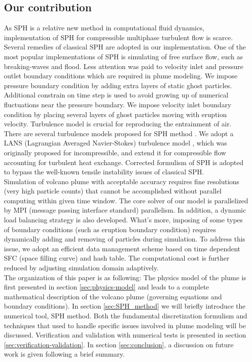 \documentclass[journal abbreviation, manuscript]{copernicus}
\begin{document}
\subsection{Our contribution}
As SPH is a relative new method in computational fluid dynamics, implementation of SPH for compressible multiphase turbulent flow is scarce. Several remedies of classical SPH are adopted in our implementation. One of the most popular implementations of SPH is simulating of free surface flow, such as breaking-waves and flood. Less attention was paid to velocity inlet and pressure outlet boundary conditions which are required in plume modeling. We impose pressure boundary condition by adding extra layers of static ghost particles. Additional constrain on time step is used to avoid growing up of numerical fluctuations near the pressure boundary. We impose velocity inlet boundary condition by placing several layers of ghost particles moving with eruption velocity. Turbulence model is crucial for reproducing the entrainment of air. There are several turbulence models proposed for SPH method \citep{issa2005numerical,violeau2007numerical}. We adopt a LANS (Lagrangian Averaged Navier-Stokes) turbulence model \citep{monaghan2011turbulence}, which was originally proposed for incompressible, and extend it for compressible flow accounting for turbulent heat exchange. Corrected formulism of SPH is adopted to bypass the well-known tensile instability issues of classical SPH.\\
%
Simulation of volcano plume with acceptable accuracy requires fine resolutions (very high particle counts) that cannot be accomplished without parallel computing within given time window. The core solver of our model is parallelized by MPI (message passing interface standard) parallelism. In addition, a dynamic load balancing strategy is also developed. What's more, imposing of some types of boundary conditions (such as eruption boundary condition) requires dynamically adding and removing of particles during simulation. To address this issue, we adopt an efficient data management scheme based on time dependent SFC (space filling curve) and hash table. The computational cost is further reduced by adjusting simulation domain adaptively.\\
The organization of this paper is as following:
The physics model of the plume is first presented in section \ref{sec:physics-model} and leads to a complete mathematical description of the volcano plume (governing equations and boundary conditions). In section \ref{sec:SPH_method} we will briefly introduce the numerical tool, SPH method. Both the fundamental discretization formulism and techniques that used to handle specific issues involved in plume modeling will be discussed. Verification and validation with numerical tests is presented in section \ref{sec:verification-validation}. In section \ref{sec:conclusion}, a discussion on future work is given following a brief summary.
\end{document}
